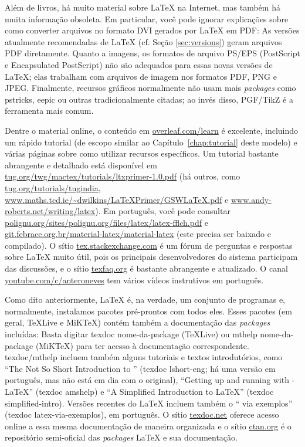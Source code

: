 \enlargethispage{-.5\baselineskip}

Além de livros, há muito material sobre \LaTeX{} na Internet, mas também há
muita informação obsoleta. Em particular, você pode ignorar explicações
sobre como converter arquivos no formato DVI gerados por \LaTeX{} em PDF:
As versões atualmente recomendadas de \LaTeX{} (cf. Seção \ref{sec:versions})
geram arquivos PDF diretamente. Quanto a imagens, os formatos de arquivo
PS/EPS (PostScript e Encapsulated PostScript) não são adequados para
essas novas versões de \LaTeX{}; elas trabalham com arquivos de imagem
nos formatos PDF, PNG e JPEG. Finalmente, recursos gráficos normalmente
não usam mais \textit{packages} como \textsf{pstricks}, \textsf{eepic} ou
outras tradicionalmente citadas; ao invés disso, \textsf{PGF/TikZ} é a
ferramenta mais comum.

Dentre o material online, o conteúdo em \url{overleaf.com/learn} é excelente,
incluindo um rápido tutorial (de escopo similar ao Capítulo~\ref{chap:tutorial}
deste modelo) e várias páginas sobre como utilizar recursos específicos. Um
tutorial bastante abrangente e detalhado está disponível em
\url{tug.org/twg/mactex/tutorials/ltxprimer-1.0.pdf} (há outros, como
\url{tug.org/tutorials/tugindia},
\url{www.maths.tcd.ie/~dwilkins/LaTeXPrimer/GSWLaTeX.pdf} e
\url{www.andy-roberts.net/writing/latex}). Em português, você pode consultar
\url{polignu.org/sites/polignu.org/files/latex/latex-fflch.pdf} e
\url{git.febrace.org.br/material-latex/material-latex} (este precisa ser
baixado e compilado). O sítio \url{tex.stackexchange.com} é
um fórum de perguntas e respostas sobre \LaTeX{} muito útil, pois os
principais desenvolvedores do sistema participam das discussões, e o sítio
\url{texfaq.org} é bastante abrangente e atualizado. O canal
\url{youtube.com/c/anteroneves} tem vários vídeos instrutivos em português.

Como dito anteriormente, \LaTeX{} é, na verdade, um conjunto de programas e,
normalmente, instalamos pacotes pré-prontos com todos eles. Esses pacotes (em
geral, \TeX{}Live e MiK\TeX{}) contém também a documentação das
\textit{packages} incluídas: Basta digitar \textsf{texdoc nome-da-package}
(\TeX{}Live) ou \textsf{mthelp nome-da-package} (MiK\TeX{}) para ter acesso à
documentação correspondente. \textsf{texdoc/mthelp} incluem também alguns
tutoriais e textos introdutórios, como ``The Not So Short Introduction to
\LaTeXe{}'' (\textsf{texdoc lshort-eng}; há uma versão em português, mas não
está em dia com o original), ``Getting up and running with \AmS-\LaTeX{}''
(\textsf{texdoc amshelp}) e ``A Simplified Introduction to \LaTeX{}''
(\textsf{texdoc simplified-intro}). Versões recentes do \LaTeX{} incluem
também o ``\LaTeXe{} via exemplos'' (\textsf{texdoc latex-via-exemplos}),
em português. O sítio \url{texdoc.net} oferece acesso online a essa mesma
documentação de maneira organizada e o sítio \url{ctan.org} é o
repositório semi-oficial das \textit{packages} \LaTeX{} e sua documentação.

